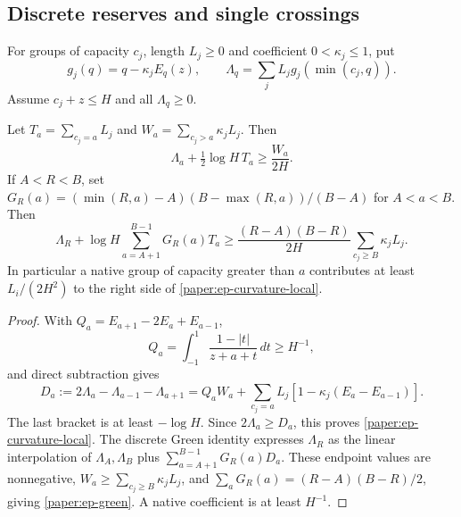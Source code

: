 \subsection{Discrete reserves and single crossings}
\label{paper:ep-reserves}
For groups of capacity $c_j$, length $L_j\geq0$ and coefficient
$0<\kappa_j\leq1$, put
\[
 g_j(q)=q-\kappa_jE_q(z),\qquad
 \Lambda_q=\sum_jL_jg_j(\min(c_j,q)).
\]
Assume $c_j+z\leq H$ and all $\Lambda_q\geq0$.
\begin{lemma}\label{paper:ep-curvature}
Let $T_a=\sum_{c_j=a}L_j$ and
$W_a=\sum_{c_j>a}\kappa_jL_j$.  Then
\begin{equation}\label{paper:ep-curvature-local}
 \Lambda_a+\tfrac12\log H\,T_a\geq\frac{W_a}{2H}.
\end{equation}
If $A<R<B$, set
$G_R(a)=(\min(R,a)-A)(B-\max(R,a))/(B-A)$ for $A<a<B$.
Then
\begin{equation}\label{paper:ep-green}
 \Lambda_R+\log H\sum_{a=A+1}^{B-1}G_R(a)T_a
 \geq\frac{(R-A)(B-R)}{2H}
                  \sum_{c_j\geq B}\kappa_jL_j.
\end{equation}
In particular a native group of capacity greater than $a$ contributes
at least $L_i/(2H^2)$ to the right side of
\eqref{paper:ep-curvature-local}.
\end{lemma}
\begin{proof}
With $Q_a=E_{a+1}-2E_a+E_{a-1}$,
\[
 Q_a=\int_{-1}^1\frac{1-|t|}{z+a+t}\,dt\geq H^{-1},
\]
and direct subtraction gives
\[
 D_a:=2\Lambda_a-\Lambda_{a-1}-\Lambda_{a+1}
 =Q_aW_a+\sum_{c_j=a}L_j[1-\kappa_j(E_a-E_{a-1})].
\]
The last bracket is at least $-\log H$.  Since
$2\Lambda_a\geq D_a$, this proves \eqref{paper:ep-curvature-local}.
The discrete Green identity expresses $\Lambda_R$ as the linear
interpolation of $\Lambda_A,\Lambda_B$ plus
$\sum_{a=A+1}^{B-1}G_R(a)D_a$.  These endpoint values are nonnegative,
$W_a\geq\sum_{c_j\geq B}\kappa_jL_j$, and
$\sum_aG_R(a)=(R-A)(B-R)/2$, giving \eqref{paper:ep-green}.
A native coefficient is at least $H^{-1}$.
\end{proof}

